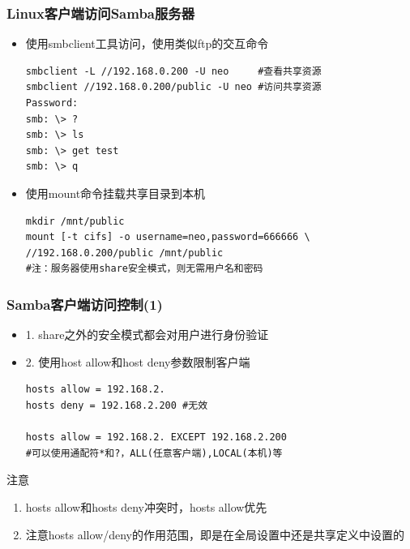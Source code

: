 \documentclass[xcolor=svgnames,presentation]{beamer}
\begin{document}
\begin{frame}[fragile]
\frametitle{Linux客户端访问Samba服务器}
\label{sec-2-16}
\begin{itemize}

\item 使用smbclient工具访问，使用类似ftp的交互命令\\
\label{sec-2-16-1}%
\begin{verbatim}
smbclient -L //192.168.0.200 -U neo     #查看共享资源
smbclient //192.168.0.200/public -U neo #访问共享资源
Password: 
smb: \> ?
smb: \> ls
smb: \> get test
smb: \> q
\end{verbatim}

\item 使用mount命令挂载共享目录到本机\\
\label{sec-2-16-2}%
\begin{verbatim}
mkdir /mnt/public
mount [-t cifs] -o username=neo,password=666666 \
//192.168.0.200/public /mnt/public
#注：服务器使用share安全模式，则无需用户名和密码
\end{verbatim}
\end{itemize} %
\end{frame}
\begin{frame}[fragile]
\frametitle{Samba客户端访问控制(1)}
\label{sec-2-17}
\begin{itemize}

\item 1. share之外的安全模式都会对用户进行身份验证
\label{sec-2-17-1}%

\item 2. 使用host allow和host deny参数限制客户端\\
\label{sec-2-17-2}%
\begin{verbatim}
hosts allow = 192.168.2.
hosts deny = 192.168.2.200 #无效

hosts allow = 192.168.2. EXCEPT 192.168.2.200
#可以使用通配符*和?，ALL(任意客户端),LOCAL(本机)等
\end{verbatim}
\end{itemize} %
\begin{block}{注意}
\label{sec-2-17-3}

\begin{enumerate}
\item hosts allow和hosts deny冲突时，hosts allow优先
\item 注意hosts allow/deny的作用范围，即是在全局设置中还是共享定义中设置的
\end{enumerate}
\end{block}
\end{frame}
\end{document}
